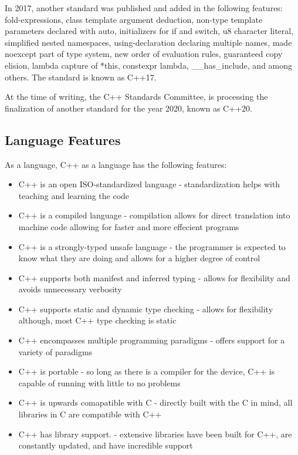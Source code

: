 \documentclass[12pt]{article}
\begin{document}
In 2017, another standard was published and added in the following features: fold-expressions, class template argument deduction, non-type template parameters declared with auto, initializers for if and switch, u8 character literal, simplified nested namespaces, using-declaration declaring multiple names, made noexcept part of type system, new order of evaluation rules, guaranteed copy elision, lambda capture of *this, constexpr lambda, \_\_has\_include, and among others. The standard is known as C++17.

At the time of writing, the C++ Standards Committee, is processing the finalization of another standard for the year 2020, known as C++20.

\subsection{Language Features}
As a language, C++ as a language has the following features:

\begin{itemize}
  \item C++ is an open ISO-standardized language - standardization helps with teaching and learning the code
  \item C++ is a compiled language - compilation allows for direct translation into machine code allowing for faster and more effecient programs
  \item C++ is a strongly-typed unsafe language - the programmer is expected to know what they are doing and allows for a higher degree of control
  \item C++ supports both manifest and inferred typing - allows for flexibility and avoids unnecessary verbosity
  \item C++ supports static and dynamic type checking - allows for flexibility although, most C++ type checking is static
  \item C++ encompasses multiple programming paradigms - offers support for a variety of paradigms
  \item C++ is portable - so long as there is a compiler for the device, C++ is capable of running with little to no problems
  \item C++ is upwards comapatible with C - directly built with the C in mind, all libraries in C are compatible with C++
  \item C++ has library support. - extensive libraries have been built for C++, are constantly updated, and have incredible support
\end{itemize}
\end{document}
